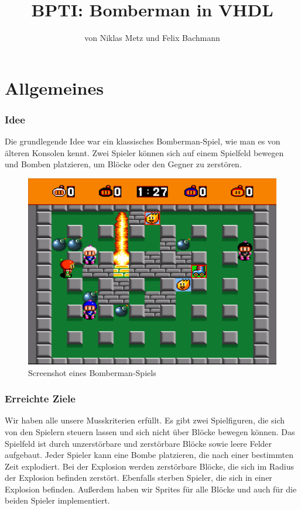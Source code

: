 \documentclass[parskip=full]{scrartcl}
\title{BPTI: Bomberman in VHDL}
\subtitle{von Niklas Metz und Felix Bachmann}
\begin{document}
	\maketitle
	\newpage
	\tableofcontents
	\newpage
	
	\part{Allgemeines}
		\section{Idee}
			Die grundlegende Idee war ein klassisches Bomberman-Spiel, wie man es von älteren Konsolen kennt. Zwei Spieler können sich auf einem Spielfeld bewegen und Bomben platzieren, um Blöcke oder den Gegner zu zerstören.
			\begin{figure}[H]
				\centering
				\includegraphics[scale=0.4]{./bilder/bomberman.png}
				\caption{Screenshot eines Bomberman-Spiels}
			\end{figure}
		
		\section{Erreichte Ziele}
			Wir haben alle unsere Musskriterien erfüllt. Es gibt zwei Spielfiguren, die sich von den Spielern steuern lassen und sich nicht über Blöcke bewegen können. Das Spielfeld ist durch unzerstörbare und  zerstörbare Blöcke sowie leere Felder aufgebaut. Jeder Spieler kann eine Bombe platzieren, die nach einer bestimmten Zeit explodiert. Bei der Explosion werden zerstörbare Blöcke, die sich im Radius der Explosion befinden zerstört. Ebenfalls sterben Spieler, die sich in einer Explosion befinden. \newline
			Außerdem haben wir Sprites für alle Blöcke und auch für die beiden Spieler implementiert. \newline
			
\end{document}
